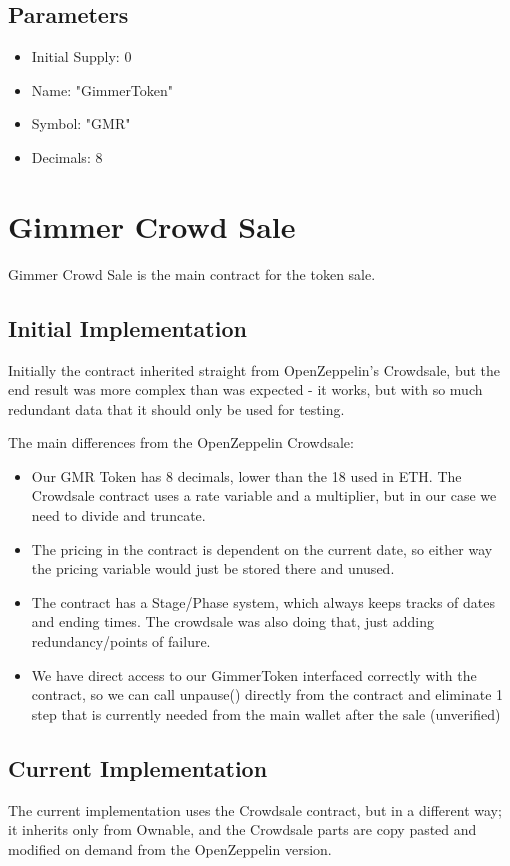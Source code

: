\documentclass[11pt]{article} %
\begin{document}
\subsection{Parameters}

\begin{itemize}
\item Initial Supply: 0
\item Name: "GimmerToken"
\item Symbol: "GMR"
\item Decimals: 8
\end{itemize}


\section{Gimmer Crowd Sale}

Gimmer Crowd Sale is the main contract for the token sale.

\subsection{Initial Implementation}
Initially the contract inherited straight from OpenZeppelin's Crowdsale, but the end result was more complex than was expected - it works, but with so much redundant data that it should only be used for testing.

The main differences from the OpenZeppelin Crowdsale:

\begin{itemize}
\item Our GMR Token has 8 decimals, lower than the 18 used in ETH. The Crowdsale contract uses a rate variable and a multiplier, but in our case we need to divide and truncate.
\item The pricing in the contract is dependent on the current date, so either way the pricing variable would just be stored there and unused.
\item The contract has a Stage/Phase system, which always keeps tracks of dates and ending times. The crowdsale was also doing that, just adding redundancy/points of failure.
\item We have direct access to our GimmerToken interfaced correctly with the contract, so we can call unpause() directly from the contract and eliminate 1 step that is currently needed from the main wallet after the sale (unverified)
\end{itemize}

\subsection{Current Implementation}
The current implementation uses the Crowdsale contract, but in a different way; it inherits only from Ownable, and the Crowdsale parts are copy pasted and modified on demand from the OpenZeppelin version.
\end{document}
